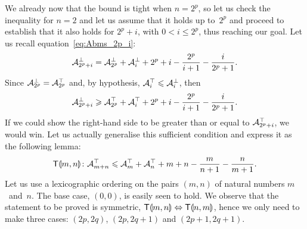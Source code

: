 We already now that the bound is tight when \(n=2^p\), so
let us check the inequality for \(n=2\) and let us assume that it
holds up to~\(2^p\) and proceed to establish that it also holds for
\(2^p+i\), with \(0 < i \leqslant 2^p\), thus reaching our goal. Let
us recall equation~\eqref{eq:Abms_2p_i}:
\begin{equation*}
\mathcal{A}_{2^p+i}^{\bot} = \mathcal{A}_{2^p}^{\bot} + \mathcal{A}_{i}^{\bot}
+ 2^p + i - \frac{2^p}{i+1} - \frac{i}{2^p+1}.
\end{equation*}
Since \(\mathcal{A}_{2^p}^{\bot} = \mathcal{A}_{2^p}^{\top}\) and, by
hypothesis, \(\mathcal{A}_{i}^{\top} \leqslant \mathcal{A}_{i}^{\bot}\), then
\begin{equation}
\mathcal{A}_{2^p+i}^{\bot} \geqslant \mathcal{A}_{2^p}^{\top} + \mathcal{A}_{i}^{\top}
+ 2^p + i - \frac{2^p}{i+1} - \frac{i}{2^p+1}.
\label{ineq:Atms_Abms}
\end{equation}
If we could show the right-hand side to be greater than or equal
to \(\mathcal{A}_{2^p+i}^{\top}\), we would win. Let us actually generalise
this sufficient condition and express it as the following lemma:
\begin{equation*}
  \textsf{T}\llparenthesis{m,n}\rrparenthesis \colon
  \mathcal{A}_{m+n}^{\top} \leqslant \mathcal{A}_{m}^{\top} + \mathcal{A}_{n}^{\top} +
  m + n - \frac{m}{n+1} - \frac{n}{m+1}.
\end{equation*}
Let us use a lexicographic ordering on the pairs \((m,n)\) of natural
numbers \(m\)~and~\(n\). The base case, \((0,0)\), is easily seen to
hold. We observe that the statement to be proved is symmetric,
\(\textsf{T}\llparenthesis{m,n}\rrparenthesis \Leftrightarrow \textsf{T}\llparenthesis{n,m}\rrparenthesis\), hence we only need to
make three cases: \((2p,2q)\), \((2p,2q+1)\) and \((2p+1,2q+1)\).
